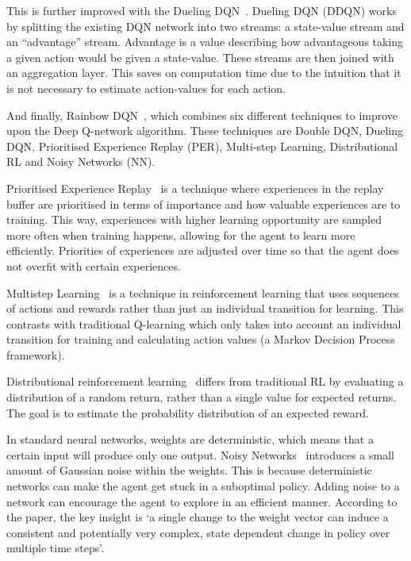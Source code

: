 \documentclass[12pt,a4paper]{article}
\begin{document}
    This is further improved with the Dueling DQN~\citep{wang16}.
    Dueling DQN (DDQN) works by splitting the existing DQN network into two streams: a state-value stream and an ``advantage'' stream.
    Advantage is a value describing how advantageous taking a given action would be given a state-value.
    These streams are then joined with an aggregation layer.
    This saves on computation time due to the intuition that it is not necessary to estimate action-values for each action.

    And finally, Rainbow DQN~\citep{hessel17}, which combines six different techniques to improve upon the Deep Q-network algorithm.
    These techniques are Double DQN, Dueling DQN, Prioritised Experience Replay (PER),
    Multi-step Learning, Distributional RL and Noisy Networks (NN).

    Prioritised Experience Replay~\citep{schaul16} is a technique where experiences in the replay buffer are prioritised in terms of importance and how valuable experiences are to training.
    This way, experiences with higher learning opportunity are sampled more often when training happens, allowing for the agent to learn more efficiently.
    Priorities of experiences are adjusted over time so that the agent does not overfit with certain experiences.

    Multistep Learning~\citep[chap.~7.1]{sutton18} is a technique in reinforcement learning that uses sequences of actions and rewards rather than just an individual transition for learning.
    This contrasts with traditional Q-learning which only takes into account an individual transition for training and calculating action values (a Markov Decision Process framework).

    Distributional reinforcement learning~\citep{bellemare17} differs from traditional RL by evaluating a distribution of a random return, rather than a single value for expected returns.
    The goal is to estimate the probability distribution of an expected reward.

    In standard neural networks, weights are deterministic, which means that a certain input will produce only one output.
    Noisy Networks~\citep{fortunato19} introduces a small amount of Gaussian noise within the weights.
    This is because deterministic networks can make the agent get stuck in a suboptimal policy.
    Adding noise to a network can encourage the agent to explore in an efficient manner.
    According to the paper, the key insight is `a single change to the weight vector can induce a consistent and potentially very complex, state dependent change in policy over multiple time steps'.
\end{document}
